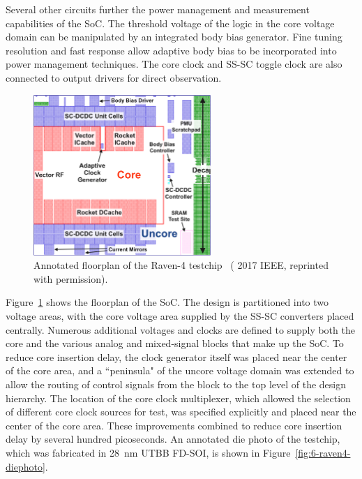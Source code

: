\documentclass[graybox]{svmult}
\begin{document}
Several other circuits further the power management and measurement capabilities of the SoC.
The threshold voltage of the logic in the core voltage domain can be manipulated by an integrated body bias generator.
Fine tuning resolution and fast response allow adaptive body bias to be incorporated into power management techniques.
The core clock and SS-SC toggle clock are also connected to output drivers for direct observation.

\begin{figure}
  \centering
  \includegraphics[width=0.6\textwidth]{6-raven4-floorplan}
  \caption{Annotated floorplan of the Raven-4 testchip~\cite{Keller2017} ({\textcopyright} 2017 IEEE, reprinted with permission).}
  \label{fig:6-raven4-floorplan}
\end{figure}

Figure~\ref{fig:6-raven4-floorplan} shows the floorplan of the SoC.
The design is partitioned into two voltage areas, with the core voltage area supplied by the SS-SC converters placed centrally.
Numerous additional voltages and clocks are defined to supply both the core and the various analog and mixed-signal blocks that make up the SoC.
To reduce core insertion delay, the clock generator itself was placed near the center of the core area, and a ``peninsula" of the uncore voltage domain was extended to allow the routing of control signals from the block to the top level of the design hierarchy.
The location of the core clock multiplexer, which allowed the selection of different core clock sources for test, was specified explicitly and placed near the center of the core area.
These improvements combined to reduce core insertion delay by several hundred picoseconds.
An annotated die photo of the testchip, which was fabricated in \SI{28}{\nano\meter} UTBB FD-SOI, is shown in Figure~\ref{fig:6-raven4-diephoto}.
\end{document}
